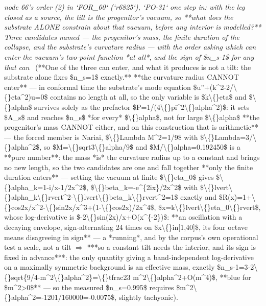 \begin{description}
\textit{node 66's order (2) in `FOR\_60` (`r6825`), `PO-31` one step in: with the leg closed as a source, the tilt is the progenitor's vacuum, so **what does the substrate ALONE constrain about that vacuum, before any interior is modelled?** Three candidates named --- the progenitor's mass, the finite duration of the collapse, and the substrate's curvature radius --- with the order asking which can enter the vacuum's two-point function *at all*, and the sign of \$n\_s-1\$ for any that can} \ (**One of the three can enter, and what it produces is not a tilt: the substrate alone fixes \$n\_s=1\$ exactly.**  **the curvature radius CANNOT enter** --- in conformal time the substrate's mode equation \$u''+(k\textasciicircum{}2-2/\textbackslash\{\}eta\textasciicircum{}2)u=0\$ contains no length at all, so the only variable is \$k\textbackslash\{\}eta\$ and \$\textbackslash\{\}alpha\$ survives solely as the prefactor \$P=1/(4\textbackslash\{\}pi\textasciicircum{}2\textbackslash\{\}alpha\textasciicircum{}2)\$: it sets \$A\_s\$ and reaches \$n\_s\$ *for every* \$\textbackslash\{\}alpha\$, not for large \$\textbackslash\{\}alpha\$  **the progenitor's mass CANNOT either, and on this construction that is arithmetic** --- the forced member is Nariai, \$\textbackslash\{\}Lambda M\textasciicircum{}2=1/9\$ with \$\textbackslash\{\}Lambda=3/\textbackslash\{\}alpha\textasciicircum{}2\$, so \$M=\textbackslash\{\}sqrt3\textbackslash\{\}alpha/9\$ and \$M/\textbackslash\{\}alpha=0.192450\$ is a **pure number**: the mass *is* the curvature radius up to a constant and brings no new length, so the two candidates are one and fall together   **only the finite duration enters** --- setting the vacuum at finite \$\textbackslash\{\}eta\_0\$ gives \$\textbackslash\{\}alpha\_k=1-i/x-1/2x\textasciicircum{}2\$, \$\textbackslash\{\}beta\_k=-e\textasciicircum{}\{2ix\}/2x\textasciicircum{}2\$ with \$\textbackslash\{\}lvert\textbackslash\{\}alpha\_k\textbackslash\{\}rvert\textasciicircum{}2-\textbackslash\{\}lvert\textbackslash\{\}beta\_k\textbackslash\{\}rvert\textasciicircum{}2=1\$ exactly and \$R(x)=1+\textbackslash\{\}cos2x/x\textasciicircum{}2-\textbackslash\{\}sin2x/x\textasciicircum{}3+(1-\textbackslash\{\}cos2x)/2x\textasciicircum{}4\$, \$x=k\textbackslash\{\}lvert\textbackslash\{\}eta\_0\textbackslash\{\}rvert\$, whose log-derivative is \$-2\textbackslash\{\}sin(2x)/x+O(x\textasciicircum{}\{-2\})\$: **an oscillation with a decaying envelope, sign-alternating 24 times on \$x\textbackslash\{\}in[1,40]\$, its four octave means disagreeing in sign** --- a *running*, and by the corpus's own operational test a scale, not a tilt \ensuremath{\Rightarrow} ***so a constant tilt needs the interior, and its sign is fixed in advance***: the only quantity giving a band-independent log-derivative on a maximally symmetric background is an effective mass, exactly \$n\_s-1=3-2\textbackslash\{\}sqrt\{9/4-m\textasciicircum{}2\textbackslash\{\}alpha\textasciicircum{}2\}=\textbackslash\{\}tfrac23 m\textasciicircum{}2\textbackslash\{\}alpha\textasciicircum{}2+O(m\textasciicircum{}4)\$, **blue for \$m\textasciicircum{}2>0\$** --- so the measured \$n\_s=0.995\$ requires \$m\textasciicircum{}2\textbackslash\{\}alpha\textasciicircum{}2=-1201/160000=-0.0075\$, slightly tachyonic). 

\end{description}
